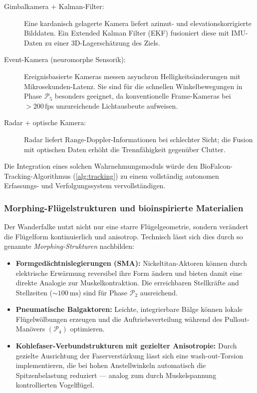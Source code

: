 ﻿\documentclass[12pt,a4paper]{article}
\theoremstyle{remark}
\begin{document}
	\begin{description}
		\item[Gimbalkamera + Kalman-Filter:] Eine kardanisch gelagerte Kamera liefert azimut- und elevationskorrigierte Bilddaten. Ein Extended Kalman Filter (EKF) fusioniert diese mit IMU-Daten zu einer 3D-Lagerschätzung des Ziels.
		\item[Event-Kamera (neuromorphe Sensorik):] Ereignisbasierte Kameras messen asynchron Helligkeitsänderungen mit Mikrosekunden-Latenz. Sie sind für die schnellen Winkelbewegungen in Phase $\mathcal{P}_5$ besonders geeignet, da konventionelle Frame-Kameras bei $> 200 \, \mathrm{fps}$ unzureichende Lichtausbeute aufweisen.
		\item[Radar + optische Kamera:] Radar liefert Range-Doppler-Informationen bei schlechter Sicht; die Fusion mit optischen Daten erhöht die Trennfähigkeit gegenüber Clutter.
	\end{description}

	Die Integration eines solchen Wahrnehmungsmoduls würde den BioFalcon-Tracking-Algorithmus (\cref{alg:tracking}) zu einem vollständig autonomen Erfassungs- und Verfolgungssystem vervollständigen.

	\subsubsection{Morphing-Flügelstrukturen und bioinspirierte Materialien}

	Der Wanderfalke nutzt nicht nur eine starre Flügelgeometrie, sondern verändert die Flügelform kontinuierlich und anisotrop. Technisch lässt sich dies durch so genannte \textit{Morphing-Strukturen} nachbilden:

	\begin{itemize}
		\item \textbf{Formgedächtnislegierungen (SMA):} Nickeltitan-Aktoren können durch elektrische Erwärmung reversibel ihre Form ändern und bieten damit eine direkte Analogie zur Muskelkontraktion. Die erreichbaren Stellkräfte and Stellzeiten ($\sim \SI{100}{\ms}$) sind für Phase $\mathcal{P}_2$ ausreichend.
		\item \textbf{Pneumatische Balgaktoren:} Leichte, integrierbare Bälge können lokale Flügelwölbungen erzeugen und die Auftriebsverteilung während des Pullout-Manövers $({\mathcal{P}_4})$ optimieren.
		\item \textbf{Kohlefaser-Verbundstrukturen mit gezielter Anisotropie:} Durch gezielte Ausrichtung der Faserverstärkung lässt sich eine wash-out-Torsion implementieren, die bei hohen Anstellwinkeln automatisch die Spitzenbelastung reduziert --- analog zum durch Muskelspannung kontrollierten Vogelflügel.
	\end{itemize}
\end{document}
